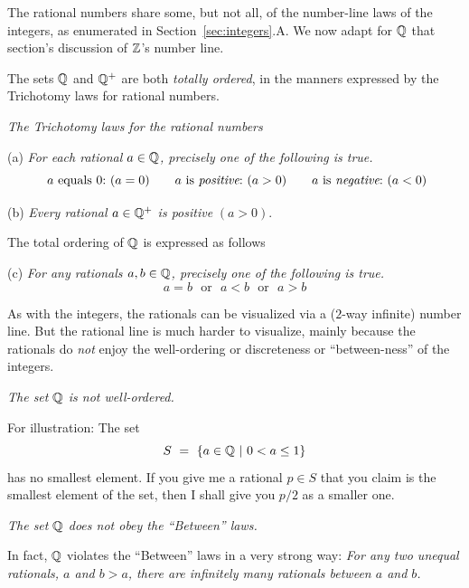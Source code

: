 The rational numbers share some, but not all, of the number-line laws
of the integers, as enumerated in Section~\ref{sec:integers}.A.
We now adapt for $\mathbb{Q}$ that section's discussion of $\mathbb{Z}$'s number line.


The sets $\mathbb{Q}$ and $\mathbb{Q}^+$ are both {\em totally ordered}, in the manners
expressed by the Trichotomy laws for rational numbers.

\medskip

\noindent
{\it The Trichotomy laws for the rational numbers}

\noindent (a)
%
{\it For each rational $a \in \mathbb{Q}$, precisely one of the following is true.}
\[
\mbox{ $a$ equals $0$:} \ (a=0) \ \ \ \
\ \mbox{ $a$ is {\em positive}:} \ (a>0) \ \ \ \
 \ \mbox{ $a$ is {\em negative}:} \ (a<0)
\]

\noindent (b)
{\it Every rational $a \in \mathbb{Q}^+$ is positive} $(a>0)$.

\medskip

\noindent
The total ordering of $\mathbb{Q}$ is expressed as follows 

\noindent (c)
{\it For any rationals $a, b \in \mathbb{Q}$, precisely one of the following
  is                               
  true.}
\[  a=b \ \ \ \mbox{or} \ \ \  a<b \ \ \ \mbox{or} \ \ \ a>b \]

\smallskip

As with the integers, the rationals can be visualized via a ($2$-way
infinite) number line.  But the rational line is much harder to
visualize, mainly because the rationals do {\em not} enjoy the
well-ordering or discreteness or ``between-ness'' of the integers.

\medskip

\noindent
{\em The set $\mathbb{Q}$ is {\em not} well-ordered.}

For illustration:  The set
\[ S \ = \ \{ a \in \mathbb{Q}  \ |\ 0 < a \leq 1 \} \]
has no smallest element.  If you give me a rational $p \in S$ that you
claim is the smallest element of the set, then I shall give you $p/2$
as a smaller one.

\medskip

\noindent
{\em The set $\mathbb{Q}$ does {\em not} obey the ``Between'' laws.}

In fact, $\mathbb{Q}$ violates the ``Between'' laws in a very strong way:
{\it For any two unequal rationals, $a$ and $b>a$, there are
  infinitely many rationals between $a$ and $b$.}

